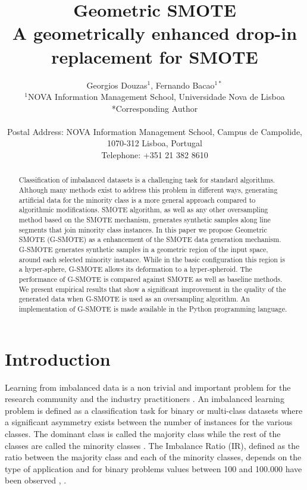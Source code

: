 \documentclass[parskip=full]{scrartcl}
\title{Geometric SMOTE \\ \LARGE{A geometrically enhanced drop-in replacement for SMOTE}}
\author{
	Georgios Douzas\(^{1}\), Fernando Bacao\(^{1*}\)
	\\
	\small{\(^{1}\)NOVA Information Management School, Universidade Nova de Lisboa}
	\\
	\small{*Corresponding Author}
	\\
	\\
	\small{Postal Address: NOVA Information Management School, Campus de Campolide, 1070-312 Lisboa, Portugal}
	\\
	\small{Telephone: +351 21 382 8610}
}
\date{}
\begin{document}
\maketitle

\begin{abstract}
Classification of imbalanced datasets is a challenging task for standard algorithms. Although many methods exist to address this problem in different ways, generating artificial data for the minority class is a more general approach compared to algorithmic modifications. SMOTE algorithm, as well as any other oversampling method based on the SMOTE mechanism, generates synthetic samples along line segments that join minority class instances. In this paper we propose Geometric SMOTE (G-SMOTE) as a enhancement of the SMOTE data generation mechanism. G-SMOTE generates synthetic samples in a geometric region of the input space, around each selected minority instance. While in the basic configuration this region is a hyper-sphere, G-SMOTE allows its deformation to a hyper-spheroid. The performance of G-SMOTE is compared against SMOTE as well as baseline methods. We present empirical results that show a significant improvement in the quality of the generated data when G-SMOTE is used as an oversampling algorithm. An implementation of G-SMOTE is made available in the Python programming language.
\end{abstract}

\section{Introduction}
Learning from imbalanced data is a non trivial and important problem for the research community and the industry practitioners \cite{Chawla2003}. An imbalanced learning problem is defined as a classification task for binary or multi-class datasets where a significant asymmetry exists between the number of instances for the various classes. The dominant class is called the majority class while the rest of the classes are called the minority classes \cite{Chawla2003}. The Imbalance Ratio (IR), defined as the ratio between the majority class and each of the minority classes, depends on the type of application and for binary problems values between 100 and 100.000 have been observed \cite{Chawla2002}, \cite{Barua2014}.
\end{document}
